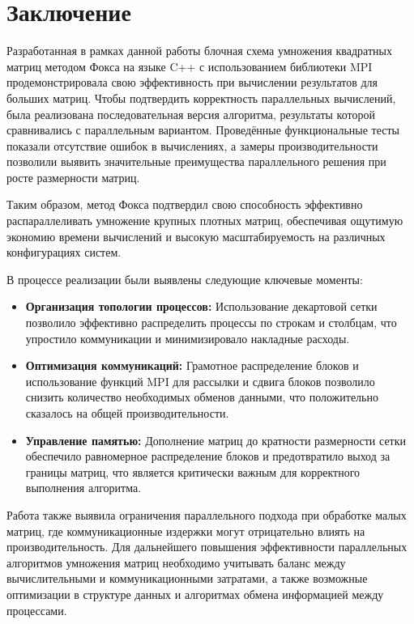 \documentclass{report}
\begin{document}
\newpage

\section*{Заключение}

Разработанная в рамках данной работы блочная схема умножения квадратных матриц методом Фокса на языке C++ с использованием библиотеки MPI продемонстрировала свою эффективность при вычислении результатов для больших матриц. Чтобы подтвердить корректность параллельных вычислений, была реализована последовательная версия алгоритма, результаты которой сравнивались с параллельным вариантом. Проведённые функциональные тесты показали отсутствие ошибок в вычислениях, а замеры производительности позволили выявить значительные преимущества параллельного решения при росте размерности матриц.

Таким образом, метод Фокса подтвердил свою способность эффективно распараллеливать умножение крупных плотных матриц, обеспечивая ощутимую экономию времени вычислений и высокую масштабируемость на различных конфигурациях систем.

В процессе реализации были выявлены следующие ключевые моменты:

\begin{itemize}
    \item \textbf{Организация топологии процессов:} Использование декартовой сетки позволило эффективно распределить процессы по строкам и столбцам, что упростило коммуникации и минимизировало накладные расходы.
    
    \item \textbf{Оптимизация коммуникаций:} Грамотное распределение блоков и использование функций MPI для рассылки и сдвига блоков позволило снизить количество необходимых обменов данными, что положительно сказалось на общей производительности.
    
    \item \textbf{Управление памятью:} Дополнение матриц до кратности размерности сетки обеспечило равномерное распределение блоков и предотвратило выход за границы матриц, что является критически важным для корректного выполнения алгоритма.
\end{itemize}

Работа также выявила ограничения параллельного подхода при обработке малых матриц, где коммуникационные издержки могут отрицательно влиять на производительность. Для дальнейшего повышения эффективности параллельных алгоритмов умножения матриц необходимо учитывать баланс между вычислительными и коммуникационными затратами, а также возможные оптимизации в структуре данных и алгоритмах обмена информацией между процессами.
\end{document}
